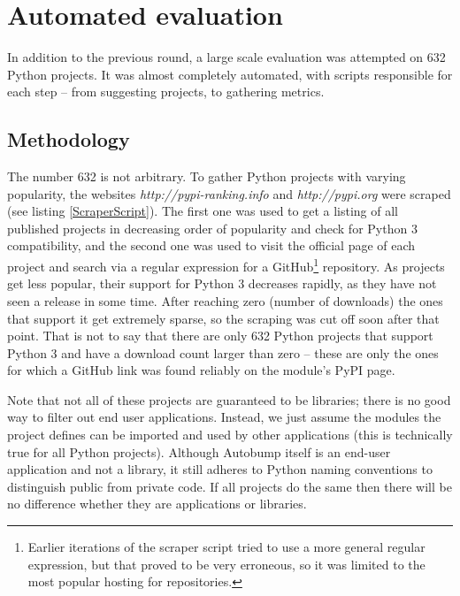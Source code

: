 \documentclass{l4proj}
\begin{document}


\section{Automated evaluation}

In addition to the previous round, a large scale evaluation was
attempted on 632 Python projects. It was almost completely automated,
with scripts responsible for each step -- from suggesting projects, to
gathering metrics.

\subsection{Methodology}

The number 632 is not arbitrary. To gather Python projects with
varying popularity, the websites \textit{http://pypi-ranking.info} and
\textit{http://pypi.org} were scraped (see listing
\ref{ScraperScript}). The first one was used to get a listing of all
published projects in decreasing order of popularity and check for
Python 3 compatibility, and the second one was used to visit the
official page of each project and search via a regular expression for
a GitHub\footnote{Earlier iterations of the scraper script tried to
use a more general regular expression, but that proved to be very
erroneous, so it was limited to the most popular hosting for
repositories.} repository. As projects get less popular, their support
for Python 3 decreases rapidly, as they have not seen a release in
some time. After reaching zero (number of downloads) the ones that
support it get extremely sparse, so the scraping was cut off soon
after that point. That is not to say that there are only 632 Python
projects that support Python 3 and have a download count larger than
zero -- these are only the ones for which a GitHub link was found
reliably on the module's PyPI page.

Note that not all of these projects are guaranteed to be libraries;
there is no good way to filter out end user applications. Instead, we
just assume the modules the project defines can be imported and used
by other applications (this is technically true for all Python
projects). Although Autobump itself is an end-user application and not
a library, it still adheres to Python naming conventions to
distinguish public from private code. If all projects do the same then
there will be no difference whether they are applications or
libraries.
\end{document}

